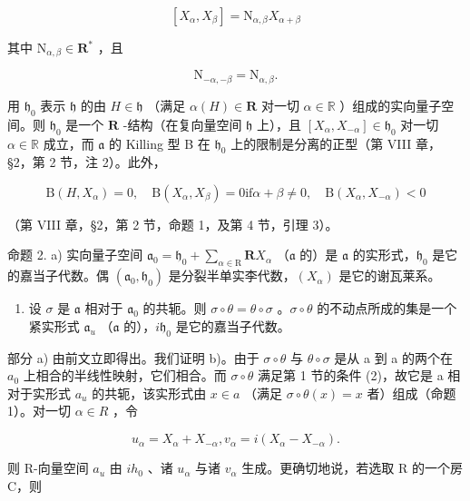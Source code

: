 \[
[ X _ {\alpha}, X _ {\beta} ] = \mathrm{N} _ {\alpha , \beta} X _ {\alpha + \beta}\tag{3}
\]

其中 \(\mathrm{N}_{\alpha ,\beta}\in \mathbf{R}^*\) ，且

\[
\mathrm{N} _ {- \alpha , - \beta} = \mathrm{N} _ {\alpha , \beta}.\tag{4}
\]

用 \(\mathfrak{h}_0\) 表示 \(\mathfrak{h}\) 的由 \(H\in \mathfrak{h}\) （满足 \(\alpha (H)\in \mathbf{R}\) 对一切 \(\alpha \in \mathbb{R}\) ）组成的实向量子空间。则 \(\mathfrak{h}_0\) 是一个 \(\mathbf{R}\) -结构（在复向量空间 \(\mathfrak{h}\) 上），且 \([X_{\alpha},X_{-\alpha}]\in \mathfrak{h}_0\) 对一切 \(\alpha \in \mathbb{R}\) 成立，而 \(\mathfrak{a}\) 的 Killing 型 B 在 \(\mathfrak{h}_0\) 上的限制是分离的正型（第 VIII 章，§2，第 2 节，注 2）。此外，

\[
\mathrm{B} (H, X _ {\alpha}) = 0, \quad \mathrm{B} (X _ {\alpha}, X _ {\beta}) = 0 \text {if} \alpha + \beta \neq 0, \quad \mathrm{B} (X _ {\alpha}, X _ {- \alpha}) <   0\tag{5}
\]

（第 VIII 章，§2，第 2 节，命题 1，及第 4 节，引理 3）。

命题 2. a) 实向量子空间 \(\mathfrak{a}_0 = \mathfrak{h}_0 + \sum_{\alpha \in \mathrm{R}} \mathbf{R}X_\alpha\) （\(\mathfrak{a}\) 的）是 \(\mathfrak{a}\) 的实形式，\(\mathfrak{h}_0\) 是它的嘉当子代数。偶 \((\mathfrak{a}_0, \mathfrak{h}_0)\) 是分裂半单实李代数，\((X_\alpha)\) 是它的谢瓦莱系。

\begin{enumerate}
\def\labelenumi{\alph{enumi})}
\setcounter{enumi}{1}
\tightlist
\item
  设 \(\sigma\) 是 \(\mathfrak{a}\) 相对于 \(\mathfrak{a}_0\) 的共轭。则 \(\sigma \circ \theta = \theta \circ \sigma\) 。\(\sigma \circ \theta\) 的不动点所成的集是一个紧实形式 \(\mathfrak{a}_u\) （\(\mathfrak{a}\) 的），\(i\mathfrak{h}_0\) 是它的嘉当子代数。
\end{enumerate}

部分 a) 由前文立即得出。我们证明 b)。由于 \(\sigma\circ\theta\) 与 \(\theta\circ\sigma\) 是从 a 到 a 的两个在 \(a_{0}\) 上相合的半线性映射，它们相合。而 \(\sigma\circ\theta\) 满足第 1 节的条件 (2)，故它是 a 相对于实形式 \(a_{u}\) 的共轭，该实形式由 \(x\in a\) （满足 \(\sigma\circ\theta(x)=x\) 者）组成（命题 1）。对一切 \(\alpha\in R\) ，令

\[
u _ {\alpha} = X _ {\alpha} + X _ {- \alpha}, v _ {\alpha} = i (X _ {\alpha} - X _ {- \alpha}).\tag{6}
\]

则 R-向量空间 \(a_{u}\) 由 \(ih_{0}\) 、诸 \(u_{\alpha}\) 与诸 \(v_{\alpha}\) 生成。更确切地说，若选取 R 的一个房 C，则

